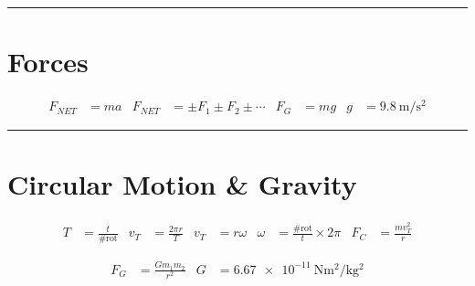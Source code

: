 \documentclass[11pt]{exam}
\begin{document}
    
\hrule
\section*{Forces}

  \begin{align*}
    F_{NET} &=  ma
  & F_{NET} &=  \pm F_1 \pm F_2 \pm \cdots
  & F_G     &=  mg
  & g       &= \SI{9.8}{\meter\per\second^2}
\end{align*}


\hrule
\section*{Circular Motion \& Gravity}

    
    \begin{align*}
        T     &=  \frac{t}{\text{\#rot}}
      & v_T   &=  \frac{2\pi r}{T}
      & v_T   &=  r\omega
      & \omega&= \frac{\text{\#rot}}{t}\times 2\pi
      & F_C   &= \frac{mv_T^2}{r}
    \end{align*}

  \begin{align*}
    F_G &= \frac{Gm_1m_2}{r^2} 
    & G &= \SI{6.67e-11}{\newton\meter^2\per\kilo\gram^2}
  \end{align*}
\end{document}
